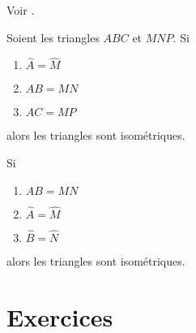 Voir \cite{TqcjwY}.

\begin{propriete}       \label{PropRtqqxJ}
    Soient les triangles \( ABC\) et \( MNP\). Si
    \begin{enumerate}
        \item
            \( \hat A=\hat M\)
        \item
            \( AB=MN\)
        \item
            \( AC=MP\)
    \end{enumerate}
    alors les triangles sont isométriques.

    Si
    \begin{enumerate}
        \item
            \( AB=MN\)
        \item
            \( \hat A=\hat M\)
        \item
            \( \hat B=\hat N\)
    \end{enumerate}
    alors les triangles sont isométriques.
\end{propriete}

\section{Exercices}


